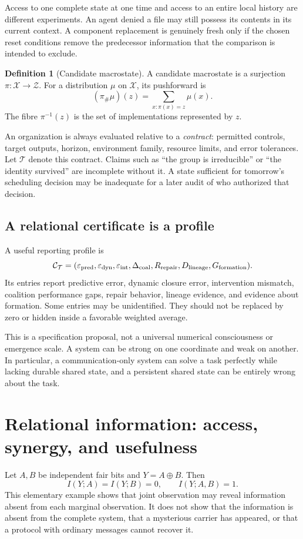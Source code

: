 \documentclass[11pt,letterpaper]{article}
\theoremstyle{plain}
\theoremstyle{definition}
\newtheorem{definition}[proposition]{Definition}
\theoremstyle{remark}
\newcommand{\X}{\mathcal X}
\newcommand{\Z}{\mathcal Z}
\newcommand{\push}{\pi_{\#}}
\begin{document}
Access to one complete state at one time and access to an entire local history are different experiments. An agent denied a file may still possess its contents in its current context. A component replacement is genuinely fresh only if the chosen reset conditions remove the predecessor information that the comparison is intended to exclude.

\begin{definition}[Candidate macrostate]\label{def:macrostate}
A candidate macrostate is a surjection $\pi:\X\to\Z$. For a distribution $\mu$ on $\X$, its pushforward is
\[
(\push\mu)(z)=\sum_{x:\pi(x)=z}\mu(x).
\]
The fibre $\pi^{-1}(z)$ is the set of implementations represented by $z$.
\end{definition}

An organization is always evaluated relative to a \emph{contract}: permitted controls, target outputs, horizon, environment family, resource limits, and error tolerances. Let $\mathcal T$ denote this contract. Claims such as ``the group is irreducible'' or ``the identity survived'' are incomplete without it. A state sufficient for tomorrow's scheduling decision may be inadequate for a later audit of who authorized that decision.

\subsection{A relational certificate is a profile}
A useful reporting profile is
\[
\mathcal C_{\mathcal T}=(\varepsilon_{\rm pred},\varepsilon_{\rm dyn},\varepsilon_{\rm int},
\Delta_{\rm coal},R_{\rm repair},D_{\rm lineage},G_{\rm formation}).
\]
Its entries report predictive error, dynamic closure error, intervention mismatch, coalition performance gaps, repair behavior, lineage evidence, and evidence about formation. Some entries may be unidentified. They should not be replaced by zero or hidden inside a favorable weighted average.

This is a specification proposal, not a universal numerical consciousness or emergence scale. A system can be strong on one coordinate and weak on another. In particular, a communication-only system can solve a task perfectly while lacking durable shared state, and a persistent shared state can be entirely wrong about the task.

\section{Relational information: access, synergy, and usefulness}\label{sec:information}
Let $A,B$ be independent fair bits and $Y=A\oplus B$. Then
\[
I(Y;A)=I(Y;B)=0,\qquad I(Y;A,B)=1.
\]
This elementary example shows that joint observation may reveal information absent from each marginal observation. It does not show that the information is absent from the complete system, that a mysterious carrier has appeared, or that a protocol with ordinary messages cannot recover it.
\end{document}
